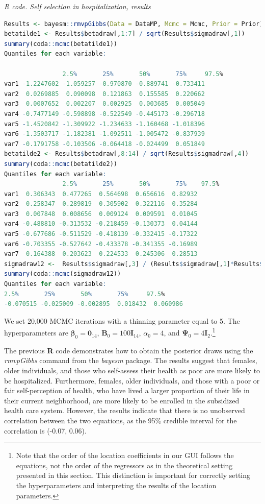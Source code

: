 \begin{tcolorbox}[enhanced,width=4.67in,center upper,
	fontupper=\large\bfseries,drop shadow southwest,sharp corners]
	\textit{R code. Self selection in hospitalization, results}
	\begin{VF}
		\begin{lstlisting}[language=R]
Results <- bayesm::rmvpGibbs(Data = DataMP, Mcmc = Mcmc, Prior = Prior)
betatilde1 <- Results$betadraw[,1:7] / sqrt(Results$sigmadraw[,1])
summary(coda::mcmc(betatilde1))
Quantiles for each variable:

				2.5%       25%       50%       75%     97.5%
var1 -1.2247602 -1.059257 -0.970870 -0.889741 -0.733411
var2  0.0269885  0.090098  0.121863  0.155585  0.220662
var3  0.0007652  0.002207  0.002925  0.003685  0.005049
var4 -0.7477149 -0.598898 -0.522549 -0.445173 -0.296718
var5 -1.4520842 -1.309922 -1.234633 -1.160468 -1.018396
var6 -1.3503717 -1.182381 -1.092511 -1.005472 -0.837939
var7 -0.1791758 -0.103506 -0.064418 -0.024499  0.051849
betatilde2 <- Results$betadraw[,8:14] / sqrt(Results$sigmadraw[,4])
summary(coda::mcmc(betatilde2))
Quantiles for each variable:
				2.5%       25%       50%       75%    97.5%
var1  0.306343  0.477265  0.564698  0.656616  0.82932
var2  0.258347  0.289819  0.305902  0.322116  0.35284
var3  0.007848  0.008656  0.009124  0.009591  0.01045
var4 -0.488810 -0.313532 -0.218459 -0.130373  0.04144
var5 -0.677686 -0.511529 -0.418139 -0.332415 -0.17322
var6 -0.703355 -0.527642 -0.433378 -0.341355 -0.16989
var7  0.164388  0.203623  0.224533  0.245306  0.28513
sigmadraw12 <-  Results$sigmadraw[,3] / (Results$sigmadraw[,1]*Results$sigmadraw[,4])^0.5
summary(coda::mcmc(sigmadraw12))
Quantiles for each variable:
2.5%       25%       50%       75%     97.5% 
-0.070515 -0.025009 -0.002895  0.018432  0.060986
\end{lstlisting}
	\end{VF}
\end{tcolorbox}

We set 20,000 MCMC iterations with a thinning parameter equal to 5. The hyperparameters are $\bm{\beta}_0 = \bm{0}_{14}$, $\bm{B}_0 = 100\bm{I}_{14}$, $\alpha_0 = 4$, and $\bm{\Psi}_0 = 4\bm{I}_2$.\footnote{Note that the order of the location coefficients in our GUI follows the equations, not the order of the regressors as in the theoretical setting presented in this section. This distinction is important for correctly setting the hyperparameters and interpreting the results of the location parameters.}

The previous \textbf{R} code demonstrates how to obtain the posterior draws using the \textit{rmvpGibbs} command from the \textit{bayesm} package. The results suggest that females, older individuals, and those who self-assess their health as poor are more likely to be hospitalized. Furthermore, females, older individuals, and those with a poor or fair self-perception of health, who have lived a larger proportion of their life in their current neighborhood, are more likely to be enrolled in the subsidized health care system. However, the results indicate that there is no unobserved correlation between the two equations, as the 95\% credible interval for the correlation is (-0.07, 0.06).

